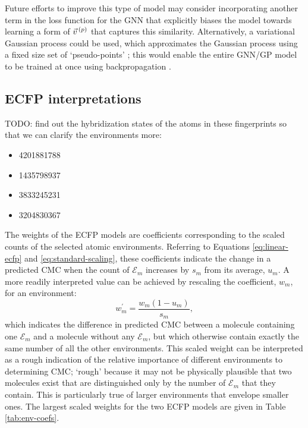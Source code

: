Future efforts to improve this type of model may consider incorporating another
term in the loss function for the GNN that explicitly biases the model towards
learning a form of $\vec{v}^{\,(p)}{}$ that captures this similarity. Alternatively, a
variational Gaussian process could be used, which approximates the Gaussian
process using a fixed size set of `pseudo-points'
\cite{hensmanGaussianProcessesBig2013a}; this would enable the entire GNN/GP
model to be trained at once using backpropagation
\cite{moriartyUnlockNNUncertaintyQuantification2022}.


\subsection{ECFP interpretations}

TODO: find out the hybridization states of the atoms in these fingerprints
so that we can clarify the environments more:
\begin{itemize}
    \item 4201881788
    \item 1435798937
    \item 3833245231
    \item 3204830367
\end{itemize}

The weights of the ECFP models are coefficients corresponding to the scaled
counts of the selected atomic environments. Referring to Equations
\ref{eq:linear-ecfp} and \ref{eq:standard-scaling}, these coefficients indicate
the change in a predicted CMC when the count of $\mathcal{E}_m$ increases by
$s_m$ from its average, $u_m$. A more readily interpreted value can be achieved
by rescaling the coefficient, $w_m$, for an environment:
\begin{equation}
    w_m^\prime = \frac{w_m(1 - u_m)}{s_m},
\end{equation}
which indicates the difference in predicted CMC between a molecule containing
one $\mathcal{E}_m$ and a molecule without any $\mathcal{E}_m$, but which
otherwise contain exactly the same number of all the other environments. This
scaled weight can be interpreted as a rough indication of the relative
importance of different environments to determining CMC; `rough' because it may
not be physically plausible that two molecules exist that are distinguished only
by the number of $\mathcal{E}_m$ that they contain. This is particularly true of
larger environments that envelope smaller ones. The largest scaled weights for
the two ECFP models are given in Table \ref{tab:env-coefs}.

